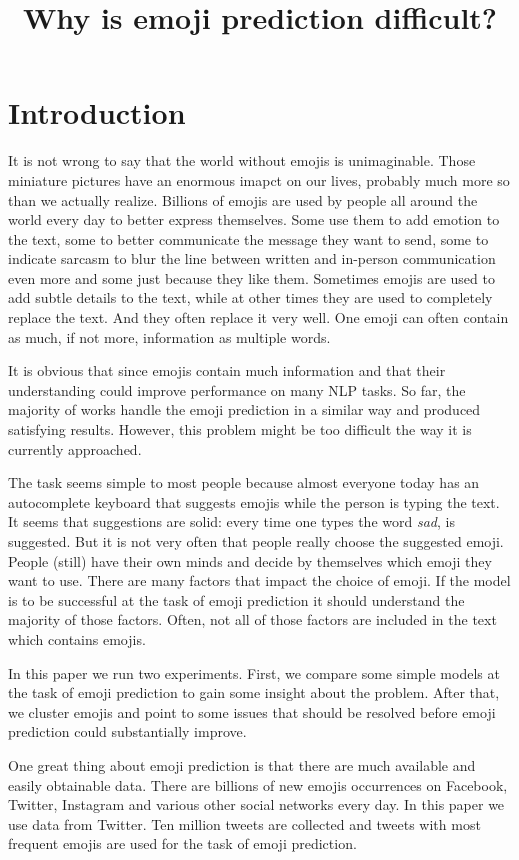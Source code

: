 \documentclass[10pt, a4paper]{article}
\title{Why is emoji prediction difficult?}
\begin{document}
\maketitleabstract

\section{Introduction}
It is not wrong to say that the world without emojis is unimaginable. Those 
miniature pictures have an enormous imapct on our lives, probably much more so than
we actually realize. Billions of emojis are used by people all around the world 
every day to better express themselves. Some use them to add emotion to the text, 
some to better communicate the message they want to send, some to indicate 
sarcasm to blur the line between written and in-person communication even more 
and some just because they like them. Sometimes emojis are used to add subtle 
details to the text, while at other times they are used to completely replace the text.
And they often replace it very well. One emoji can often contain as much, 
if not more, information as multiple words.

It is obvious that since emojis contain much information and that their understanding
could improve performance on many NLP tasks. So far, the majority of works handle 
the emoji prediction in a similar way and produced satisfying results. However, 
this problem might be too difficult the way it is currently approached. 

The task seems simple to most people because almost everyone today has an 
autocomplete keyboard that suggests emojis while the person is typing the text. 
It seems that suggestions are solid: every time one types the word \emph{sad}, 
 is suggested. But it is not very often that people really choose 
the suggested emoji. People (still) have their own minds and decide by 
themselves which emoji they want to use. There are many factors that impact the 
choice of emoji. If the model is to be successful at the task of emoji 
prediction it should understand the majority of those factors. Often, not 
all of those factors are included in the text which contains emojis.

In this paper we run two experiments. First, we compare some simple models at 
the task of emoji prediction to gain some insight about the problem. After that, 
we cluster emojis and point to some issues that should be resolved before
emoji prediction could substantially improve.

One great thing about emoji prediction is that there are much available and 
easily obtainable data. There are billions of new emojis occurrences on 
Facebook, Twitter, Instagram and various other social networks every day. In 
this paper we use data from Twitter. Ten million tweets are collected and tweets
with most frequent emojis are used for the task of emoji prediction.
\end{document}
